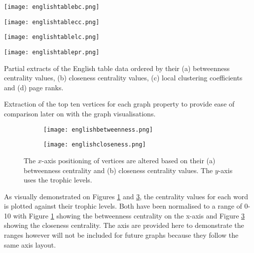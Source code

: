\begin{table}[H]
\centering
\begin{subtable}{.2\textwidth}
	\centering
	\texttt{[image: englishtablebc.png]}
	\caption{}
	\label{table:englishtablebc}
\end{subtable}
\hfill
\begin{subtable}{.2\textwidth}
	\centering
	\texttt{[image: englishtablecc.png]}
	\caption{}
	\label{table:englishtablecc}
\end{subtable}
\hfill
\begin{subtable}{.2\textwidth}
	\centering
	\texttt{[image: englishtablelc.png]}
	\caption{}
	\label{table:englishtablelc}
\end{subtable}
\hfill
\begin{subtable}{.2\textwidth}
	\centering
	\texttt{[image: englishtablepr.png]}
	\caption{}
	\label{table:englishtablepr}
\end{subtable}
\caption{Partial extracts of the English table data ordered by their (a) betweenness centrality values, (b) closeness centrality values, (c) local clustering coefficients and (d) page ranks.}
\end{table}

Extraction of the top ten vertices for each graph property to provide ease of comparison later on with the graph visualisations.

\begin{figure}[H]
\centering
\begin{subfigure}{.45\textwidth}
	\hspace{-1cm} 
	\texttt{[image: englishbetweenness.png]}
	\caption{}
	\label{fig:engbc}
\end{subfigure}
\hfill
\begin{subfigure}{.45\textwidth}
	\hspace{-1cm} 
	\texttt{[image: englishcloseness.png]}
	\caption{}
	\label{fig:engcc}
\end{subfigure}
\caption{The $x$-axis positioning of vertices are altered based on their (a) betweenness centrality and (b) closeness centrality values. The $y$-axis uses the trophic levels.}
\end{figure}

As visually demonstrated on Figures \ref{fig:engbc} and \ref{fig:engcc}, the centrality values for each word is plotted against their trophic levels. Both have been normalised to a range of 0-10 with Figure \ref{fig:engbc} showing the betweenness centrality on the x-axis and Figure \ref{fig:engcc} showing the closeness centrality. The axis are provided here to demonstrate the ranges however will not be included for future graphs because they follow the same axis layout.

